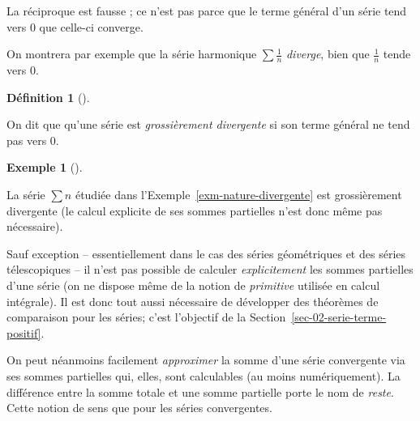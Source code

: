\documentclass[
  french,
  letterpaper,
  DIV=11,
  numbers=noendperiod]{scrreprt}
\theoremstyle{plain}
\theoremstyle{definition}
\newtheorem{definition}{Définition}[chapter]
\theoremstyle{plain}
\theoremstyle{plain}
\theoremstyle{definition}
\theoremstyle{definition}
\newtheorem{example}{Exemple}[chapter]
\theoremstyle{plain}
\theoremstyle{remark}
\newcounter{quartocalloutwrnno}
\newcommand{\quartocalloutwrn}[1]{\refstepcounter{quartocalloutwrnno}\label{#1}}
\begin{document}
\begin{tcolorbox}[enhanced jigsaw, arc=.35mm, bottomrule=.15mm, bottomtitle=1mm, breakable, colback=white, colbacktitle=quarto-callout-warning-color!10!white, colframe=quarto-callout-warning-color-frame, coltitle=black, left=2mm, leftrule=.75mm, opacityback=0, opacitybacktitle=0.6, rightrule=.15mm, title=\textcolor{quarto-callout-warning-color}{\faExclamationTriangle}\hspace{0.5em}{Avertissement \ref*{wrn-reciproque}}, titlerule=0mm, toprule=.15mm, toptitle=1mm]

\quartocalloutwrn{wrn-reciproque} 

La réciproque est fausse ; ce n'est pas parce que le terme général d'un
série tend vers \(0\) que celle-ci converge.

On montrera par exemple que la série harmonique \(\sum \frac{1}{n}\)
\emph{diverge}, bien que \(\frac{1}{n}\) tende vers \(0\).

\end{tcolorbox}

\begin{definition}[]\protect\hypertarget{def-grosierement-divergente}{}\label{def-grosierement-divergente}

On dit que qu'une série est \emph{grossièrement divergente} si son terme
général ne tend pas vers \(0\).

\end{definition}

\begin{example}[]\protect\hypertarget{exm-n}{}\label{exm-n}

La série \(\sum n\) étudiée dans l'Exemple~\ref{exm-nature-divergente}
est grossièrement divergente (le calcul explicite de ses sommes
partielles n'est donc même pas nécessaire).

\end{example}

Sauf exception -- essentiellement dans le cas des séries géométriques et
des séries télescopiques -- il n'est pas possible de calculer
\emph{explicitement} les sommes partielles d'une série (on ne dispose
même de la notion de \emph{primitive} utilisée en calcul intégrale). Il
est donc tout aussi nécessaire de développer des théorèmes de
comparaison pour les séries; c'est l'objectif de la
Section~\ref{sec-02-serie-terme-positif}.

On peut néanmoins facilement \emph{approximer} la somme d'une série
convergente via ses sommes partielles qui, elles, sont calculables (au
moins numériquement). La différence entre la somme totale et une somme
partielle porte le nom de \emph{reste}. Cette notion de sens que pour
les séries convergentes.
\end{document}

